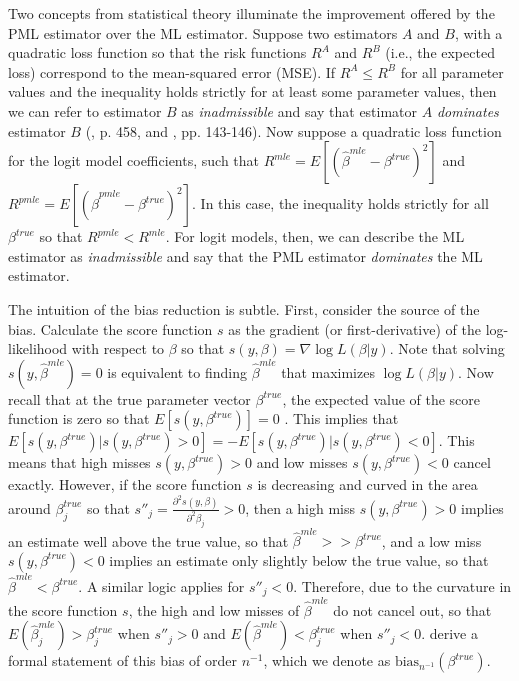 \documentclass[12pt]{article}
\begin{document}
Two concepts from statistical theory illuminate the improvement offered by the PML estimator over the ML estimator. 
Suppose two estimators $A$ and $B$, with a quadratic loss function so that the risk functions $R^A$ and $R^B$ (i.e., the expected loss) correspond to the mean-squared error (MSE). 
If $R^A \leq R^B$ for all parameter values and the inequality holds strictly for at least some parameter values, then we can refer to estimator $B$ as \textit{inadmissible} and say that estimator $A$ \textit{dominates} estimator $B$ (\citealt{DeGrootSchervish2012}, p. 458, and \citealt{LeonardHsu1999}, pp. 143-146). 
Now suppose a quadratic loss function for the logit model coefficients, such that $R^{mle} = E[(\hat{\beta}^{mle} - \beta^{true})^2]$ and $R^{pmle} = E[(\hat{\beta}^{pmle} - \beta^{true})^2]$. 
In this case, the inequality holds strictly for all $\beta^{true}$ so that $R^{pmle} < R^{mle}$. For logit models, then, we can describe the ML estimator as \textit{inadmissible} and say that the PML estimator \textit{dominates} the ML estimator.

The intuition of the bias reduction is subtle. 
First, consider the source of the bias.
Calculate the score function $s$ as the gradient (or first-derivative) of the log-likelihood with respect to $\beta$ so that $s(y, \beta) = \nabla \log L(\beta | y)$. 
Note that solving $s(y, \hat{\beta}^{mle}) = 0$ is equivalent to finding $\hat{\beta}^{mle}$ that maximizes $\log L(\beta | y)$. 
Now recall that at the true parameter vector $\beta^{true}$, the expected value of the score function is zero so that $E\left[ s(y, \beta^{true})\right] = 0$ \citep[p. 517]{Greene2012}.
This implies that $E\left[ s(y, \beta^{true}) | s(y, \beta^{true}) > 0 \right] =  -E\left[ s(y, \beta^{true}) | s(y, \beta^{true}) < 0 \right]$. 
This means that high misses $s(y, \beta^{true}) > 0$ and low misses $s(y, \beta^{true}) < 0$ cancel exactly.
However, if the score function $s$ is decreasing and curved in the area around $\beta^{true}_j$ so that $s''_j = \frac{\partial^2 s(y, \beta)}{\partial^2 \beta_j} > 0$, then a high miss $s(y, \beta^{true}) > 0$ implies an estimate well above the true value, so that $\hat{\beta}^{mle} >> \beta^{true}$, and a low miss $s(y, \beta^{true}) < 0$ implies an estimate only slightly below the true value, so that $\hat{\beta}^{mle} < \beta^{true}$.
A similar logic applies for $s''_j < 0$. 
Therefore, due to the curvature in the score function $s$, the high and low misses of $\hat{\beta}^{mle}$ do not cancel out, so that $E(\hat{\beta}^{mle}_j) > \beta^{true}_j$ when $s''_j > 0$ and $E(\hat{\beta}^{mle}) < \beta^{true}_j$ when $s''_j < 0$.
\citet[pp. 251-252]{CoxSnell1968} derive a formal statement of this bias of order $n^{-1}$, which we denote as $\text{bias}_{n^{-1}}(\beta^{true})$. 
\end{document}
